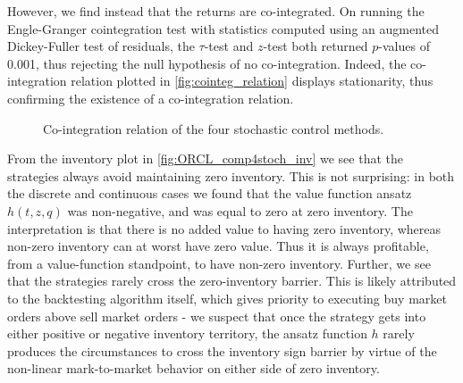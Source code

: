 However, we find instead that the returns are co-integrated. On running the Engle-Granger cointegration test with statistics computed using an augmented Dickey-Fuller test of residuals, the $\tau$-test and $z$-test both returned $p$-values of 0.001, thus rejecting the null hypothesis of no co-integration. Indeed, the co-integration relation plotted in \autoref{fig:cointeg_relation} displays stationarity, thus confirming the existence of a co-integration relation.
\begin{figure}[H]
  \centering
  \setlength{} 
  \setlength{}
  
  \caption{Co-integration relation of the four stochastic control methods.}
  \label{fig:cointeg_relation}
\end{figure}
From the inventory plot in \autoref{fig:ORCL_comp4stoch_inv} we see that the strategies always avoid maintaining zero inventory. This is not surprising: in both the discrete and continuous cases we found that the value function ansatz $h(t,z,q)$ was non-negative, and was equal to zero at zero inventory. The interpretation is that there is no added value to having zero inventory, whereas non-zero inventory can at worst have zero value. Thus it is always profitable, from a value-function standpoint, to have non-zero inventory. Further, we see that the strategies rarely cross the zero-inventory barrier. This is likely attributed to the backtesting algorithm itself, which gives priority to executing buy market orders above sell market orders - we suspect that once the strategy gets into either positive or negative inventory territory, the ansatz function $h$ rarely produces the circumstances to cross the inventory sign barrier by virtue of the non-linear mark-to-market behavior on either side of zero inventory.

